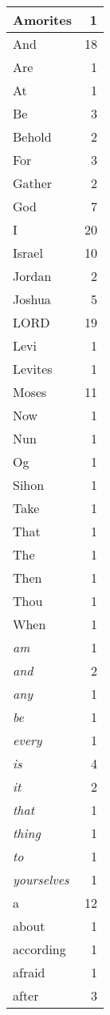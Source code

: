 \begin{center}
\begin{longtable}{l|r}
\hline \hline
\endlastfoot
Amorites & 1 \\ \hline
And & 18 \\ \hline
Are & 1 \\ \hline
At & 1 \\ \hline
Be & 3 \\ \hline
Behold & 2 \\ \hline
For & 3 \\ \hline
Gather & 2 \\ \hline
God & 7 \\ \hline
I & 20 \\ \hline
Israel & 10 \\ \hline
Jordan & 2 \\ \hline
Joshua & 5 \\ \hline
LORD & 19 \\ \hline
Levi & 1 \\ \hline
Levites & 1 \\ \hline
Moses & 11 \\ \hline
Now & 1 \\ \hline
Nun & 1 \\ \hline
Og & 1 \\ \hline
Sihon & 1 \\ \hline
Take & 1 \\ \hline
That & 1 \\ \hline
The & 1 \\ \hline
Then & 1 \\ \hline
Thou & 1 \\ \hline
When & 1 \\ \hline
\emph{am} & 1 \\ \hline
\emph{and} & 2 \\ \hline
\emph{any} & 1 \\ \hline
\emph{be} & 1 \\ \hline
\emph{every} & 1 \\ \hline
\emph{is} & 4 \\ \hline
\emph{it} & 2 \\ \hline
\emph{that} & 1 \\ \hline
\emph{thing} & 1 \\ \hline
\emph{to} & 1 \\ \hline
\emph{yourselves} & 1 \\ \hline
a & 12 \\ \hline
about & 1 \\ \hline
according & 1 \\ \hline
afraid & 1 \\ \hline
after & 3 \\ \hline

\end{longtable}
\end{center}

